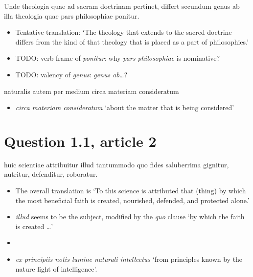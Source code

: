 \documentclass[a4paper, 12pt]{article}
\newcommand{\form}[1]{\emph{#1}}
\newcommand{\translate}[1]{`#1'}
\begin{document}
\begin{exe}
    \ex Unde theologia quae ad sacram doctrinam pertinet, differt secundum genus ab illa theologia quae pars philosophiae ponitur.
\end{exe}

\begin{itemize}
    \item Tentative translation: \translate{The theology that extends to the sacred doctrine differs 
    from the kind of that theology that is placed as a part of philosophies.}
    \item TODO: verb frame of \form{ponitur}: why \form{pars philosophiae} is nominative?
    \item TODO: valency of \form{genus}: \form{genus ab\dots}?
\end{itemize}

\begin{exe}
    \ex naturalis autem per medium circa materiam consideratum 
\end{exe}

\begin{itemize}
    \item \form{circa materiam consideratum} \translate{about the matter that is being considered}
\end{itemize}

\section{Question 1.1, article 2}

\begin{exe}
    \ex huic scientiae attribuitur illud tantummodo quo fides saluberrima gignitur, nutritur, defenditur, roboratur. 
\end{exe}

\begin{itemize}
    \item The overall translation is 
    \translate{To this science is attributed that (thing) by which the most beneficial faith is created, nourished, defended, and protected alone.}
    \item \form{illud} seems to be the subject, modified by the \form{quo} clause \translate{by which the faith is created \dots}
    \item 
\end{itemize}

\begin{itemize}
    \item \form{ex principiis notis lumine naturali intellectus} \translate{from principles known by the nature light of intelligence}.
\end{itemize}
\end{document}
